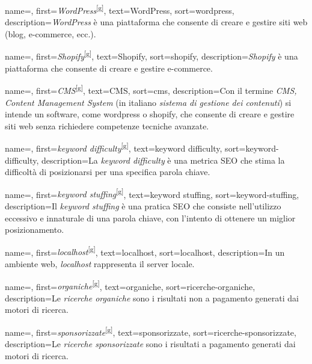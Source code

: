  {
    name=,
    first={\textit{WordPress}\textsuperscript{[g]}},
    text=WordPress,
    sort=wordpress,
    description={\textit{WordPress} è una piattaforma che consente di creare e gestire siti web (blog, e-commerce, ecc.).}
}

 {
    name=,
    first={\textit{Shopify}\textsuperscript{[g]}},
    text=Shopify,
    sort=shopify,
    description={\textit{Shopify} è una piattaforma che consente di creare e gestire e-commerce.}
}

 {
    name=,
    first={\textit{CMS}\textsuperscript{[g]}},
    text=CMS,
    sort=cms,
    description={Con il termine \textit{CMS, Content Management System} (in italiano \textit{sistema di gestione dei contenuti}) si intende un software, come \gls{wordpress} o \gls{shopify}, che consente di creare e gestire siti web senza richiedere competenze tecniche avanzate.}
}

 {
    name=,
    first={\textit{keyword difficulty}\textsuperscript{[g]}},
    text=keyword difficulty,
    sort=keyword-difficulty,
    description={La \textit{keyword difficulty} è una metrica SEO che stima la difficoltà di posizionarsi per una specifica parola chiave.}
}

 {
    name=,
    first={\textit{keyword stuffing}\textsuperscript{[g]}},
    text=keyword stuffing,
    sort=keyword-stuffing,
    description={Il \textit{keyword stuffing} è una pratica SEO che consiste nell'utilizzo eccessivo e innaturale di una parola chiave, con l'intento di ottenere un miglior posizionamento.}
}

 {
    name=,
    first={\textit{localhost}\textsuperscript{[g]}},
    text=localhost,
    sort=localhost,
    description={In un ambiente web, \textit{localhost} rappresenta il server locale.}
}

 {
    name=,
    first={\textit{organiche}\textsuperscript{[g]}},
    text=organiche,
    sort=ricerche-organiche,
    description={Le \textit{ricerche organiche} sono i risultati non a pagamento generati dai motori di ricerca.}
}

 {
    name=,
    first={\textit{sponsorizzate}\textsuperscript{[g]}},
    text=sponsorizzate,
    sort=ricerche-sponsorizzate,
    description={Le \textit{ricerche sponsorizzate} sono i risultati a pagamento generati dai motori di ricerca.}
}

